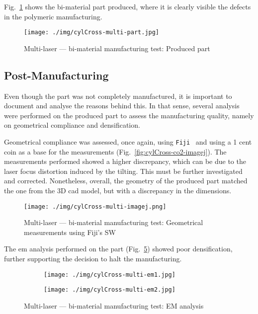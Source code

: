 Fig.~\ref{fig:cylCross-multi-produced-part} shows the bi-material part produced,
where it is clearly visible the defects in the polymeric manufacturing.
%
\begin{figure}[hbtp!]
  \centering
    \texttt{[image: ./img/cylCross-multi-part.jpg]}
%
  \caption{Multi-laser --- bi-material manufacturing test:
    Produced part}%
  \label{fig:cylCross-multi-produced-part}
\end{figure}


\subsection{Post-Manufacturing}%
\label{sec:post-manufacturing-multiLaser}
Even though the part was not completely manufactured, it is important to
document and analyse the reasons behind this.
In that sense, several analysis were performed on the
produced part to assess the manufacturing quality, namely on geometrical
compliance and densification.

Geometrical compliance was assessed, once again, using \texttt{Fiji}~\cite{fijiImageJ} and using a 1 cent coin as a
base for the measurements (Fig.~\ref{fig:cylCross-co2-imagej}).
The measurements
performed showed a higher discrepancy, which can be due to the laser focus
distortion induced by the tilting. This must be further investigated and
corrected.
Nonetheless, overall, the geometry of the produced part matched the one from the
3D \gls{cad} model, but with a discrepancy in the dimensions.

\begin{figure}[htbp!]
  \centering
  \texttt{[image: ./img/cylCross-multi-imagej.png]}%
  \caption{Multi-laser --- bi-material manufacturing test:
    Geometrical measurements using Fiji's SW}%
  \label{fig:cylCross-multi-imagej}
\end{figure}

The \gls{em} analysis performed on the part
(Fig.~\ref{fig:cylCross-multi-EM-analysis}) showed poor densification, further supporting the
decision to halt the manufacturing. 

%
\begin{figure}[htb!]
  \centering
  \begin{subfigure}[t]{.48\textwidth}
    \texttt{[image: ./img/cylCross-multi-em1.jpg]}%
  \label{fig:cylCross-multi-EM1}
  \end{subfigure}
%
  \begin{subfigure}[t]{.48\textwidth}
    \texttt{[image: ./img/cylCross-multi-em2.jpg]}%
  \label{fig:cylCross-multi-EM2}
  \end{subfigure}
  \caption{Multi-laser --- bi-material manufacturing test:
    EM analysis}%
  \label{fig:cylCross-multi-EM-analysis}
\end{figure}

